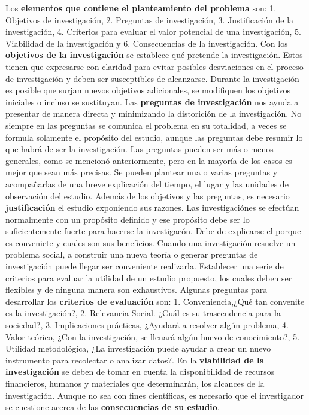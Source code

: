 \documentclass[conference]{IEEEtran}
\begin{document}
Los \textbf{elementos que contiene el planteamiento del problema} son: 1. Objetivos de investigación, 2. Preguntas de investigación, 3. Justificación de la investigación, 4. Criterios para evaluar el valor potencial de una investigación, 5. Viabilidad de la investigación y 6. Consecuencias de la investigación. Con los \textbf{objetivos de la investigación} se establece qué pretende la investigación. Estos tienen que expresarse con claridad para evitar posibles desviaciones en el proceso de investigación y deben ser susceptibles de alcanzarse. Durante la investigación es posible que surjan nuevos objetivos adicionales, se modifiquen los objetivos iniciales o incluso se sustituyan. Las \textbf{preguntas de investigación} nos ayuda a presentar de manera directa y minimizando la distorición de la investigación. No siempre en las preguntas se comunica el problema en su totalidad, a veces se formula solamente el propósito del estudio, aunque las preguntas debe resumir lo que habrá de ser la investigación. Las preguntas pueden ser más o menos generales, como se mencionó anteriormente, pero en la mayoría de los casos es mejor que sean más precisas. Se pueden plantear una o varias preguntas y acompañarlas de una breve explicación del tiempo, el lugar y las unidades de observación del estudio. Además de los objetivos y las preguntas, es necesario  \textbf{justificación} el estudio exponiendo sus razones. Las investigaciónes se efectúan normalmente con un propósito definido y ese propósito debe ser lo suficientemente fuerte para hacerse la investigacón. Debe de explicarse el porque es conveniete y cuales son sus beneficios. Cuando una investigación resuelve un problema social, a construir una nueva teoría o generar preguntas de investigación puede llegar ser conveniente realizarla. Establecer una serie de criterios para evaluar la utilidad de un estudio propuesto, los cuales deben ser flexibles y de ninguna manera son exhaustivos. Algunas preguntas para desarrollar los \textbf{criterios de evaluación} son: 1. Conveniencia,¿Qué tan convenite es la investigación?, 2. Relevancia Social. ¿Cuál es su trascendencia para la sociedad?, 3. Implicaciones prácticas, ¿Ayudará a resolver algún problema, 4. Valor teórico, ¿Con la investigación, se llenará algún huevo de conocimiento?, 5. Utilidad metodológica, ¿La investigación puede ayudar a crear un nuevo instrumento para recolectar o analizar datos?. En la \textbf{viabilidad de la investigación} se deben de tomar en cuenta la disponibilidad de recursos financieros, humanos y materiales que determinarán, los alcances de la investigación. Aunque no sea con fines científicas, es necesario que el investigador se cuestione acerca de las \textbf{consecuencias de su estudio}. 
\end{document}
